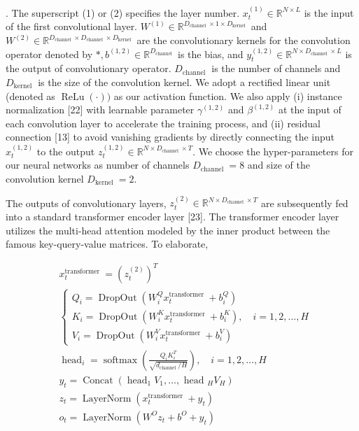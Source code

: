 \documentclass[12pt,article]{memoir}
\begin{document}
. The superscript (1) or (2) specifies the layer number. $x_t^{(1)} \in \mathbb{R}^{N \times L}$ is the input of the first convolutional layer. $W^{(1)} \in \mathbb{R}^{D_{\text {channel }} \times 1 \times D_{\text {kernel }}}$ and $W^{(2)} \in \mathbb{R}^{D_{\text {channel }} \times D_{\text {channel }} \times D_{\text {kernel }}}$ are the convolutionary kernels for the convolution operator denoted by $*, b^{(1,2)} \in \mathbb{R}^{D_{\text {channel }}}$ is the bias, and $y_t^{(1,2)} \in \mathbb{R}^{N \times D_{\text {channel }} \times L}$ is the output of convolutionary operator. $D_{\text {channel }}$ is the number of channels and $D_{\text {kernel }}$ is the size of the convolution kernel. We adopt a rectified linear unit (denoted as $\operatorname{ReLu}(\cdot))$ as our activation function. We also apply (i) instance normalization [22] with learnable parameter $\gamma^{(1,2)}$ and $\beta^{(1,2)}$ at the input of each convolution layer to accelerate the training process, and (ii) residual connection [13] to avoid vanishing gradients by directly connecting the input $x_t^{(1,2)}$ to the output $z_t^{(1,2)} \in \mathbb{R}^{N \times D_{\text {channel }} \times T}$. We choose the hyper-parameters for our neural networks as number of channels $D_{\text {channel }}=8$ and size of the convolution kernel $D_{\text {kernel }}=2$.


The outputs of convolutionary layers, $z_t^{(2)} \in \mathbb{R}^{N \times D_{\text {channel }} \times T}$ are subsequently fed into a standard transformer encoder layer [23]. The transformer encoder layer utilizes the multi-head attention modeled by the inner product between the famous key-query-value matrices. To elaborate,

$$
\begin{aligned}
& x_t^{\text {transformer }}=\left(z_t^{(2)}\right)^T \\
& \left\{\begin{array}{l}
Q_i=\operatorname{DropOut}\left(W_i^Q x_t^{\text {transformer }}+b_i^Q\right) \\
K_i=\operatorname{DropOut}\left(W_i^K x_t^{\text {transformer }}+b_i^K\right), \quad i=1,2, \ldots, H \\
V_i=\operatorname{DropOut}\left(W_i^V x_t^{\text {transformer }}+b_i^V\right)
\end{array}\right. \\
& \operatorname{head}_i=\operatorname{softmax}\left(\frac{Q_i K_i^T}{\sqrt{d_{\text {channel }} / H}}\right), \quad i=1,2, \ldots, H \\
& y_t=\operatorname{Concat}\left(\operatorname{head}_1 V_1, \ldots, \text { head }{ }_H V_H\right) \\
& z_t=\operatorname{LayerNorm}\left(x_t^{\text {transformer }}+y_t\right) \\
& o_t=\operatorname{LayerNorm}\left(W^O z_t+b^O+y_t\right)
\end{aligned}
$$
\end{document}
